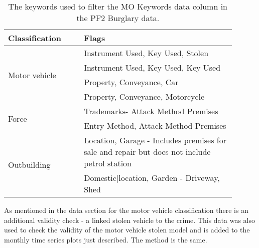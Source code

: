 \begin{table}[]
\centering
\begin{tabular}{p{0.3\linewidth}|p{0.6\linewidth}}
\toprule
Classification                    & Flags                                                                                     \\ \midrule
\multirow{4}{*}{Motor vehicle}    & Instrument Used, Key Used, Stolen                                                            \\
                                  & Instrument Used, Key Used, Key Used                                                          \\
                                  & Property, Conveyance, Car                                                                    \\
                                  & Property, Conveyance, Motorcycle                                                             \\ \midrule
\multirow{2}{*}{Force}       & Trademarks- Attack Method Premises                                                           \\
                                  & Entry Method, Attack Method Premises                                                         \\ \midrule
\multirow{2}{*}{Outbuilding} & Location, Garage - Includes premises for sale and repair but does not include petrol station \\
                                  & Domestic|location, Garden - Driveway, Shed                                                   \\ \bottomrule
\end{tabular}
\caption[Burglary Keywords]{\label{tab:burg_keywords}The keywords used to filter the MO Keywords data column in the PF2 Burglary data. }
\end{table}


As mentioned in the data section for the motor vehicle classification there is an additional validity check - a linked stolen vehicle to the crime. This data was also used to check the validity of the motor vehicle stolen model and is added to the monthly time series plots just described. The method is the same.   

